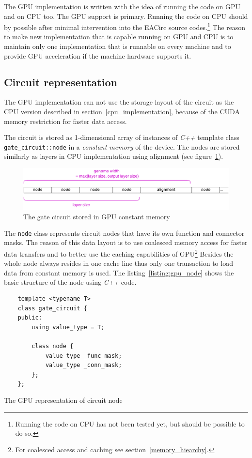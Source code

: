 \documentclass[12pt,oneside]{fithesis2}
\begin{document}
The GPU implementation is written with the idea of running the code on GPU and on CPU too. The GPU support is primary. Running the code on CPU should by possible after minimal intervention into the EACirc source codes.\footnote{Running the code on CPU has not been tested yet, but should be possible to do so.} The reason to make new implementation that is capable running on GPU and CPU is to maintain only one implementation that is runnable on every machine and to provide GPU acceleration if the machine hardware supports it.

\subsection{Circuit representation}
\label{gpu_curcuit_repr}

The GPU implementation can not use the storage layout of the circuit as the CPU version described in section~\ref{cpu_implementation}, because of the CUDA memory restriction for faster data access.

The circuit is stored as 1-dimensional array of instances of \emph{C++} template class \texttt{gate\_circuit::node} in a \emph{constant memory} of the device. The nodes are stored similarly as layers in CPU implementation using alignment (see figure~\ref{fig:gpu_genome}).

\begin{figure}[h]
	\centering
	\includegraphics[width=\textwidth]{figures/gpu_genome.pdf}
	\caption{The gate circuit stored in GPU constant memory}
	\label{fig:gpu_genome}
\end{figure}


The \texttt{node} class represents circuit nodes that have its own function and connector masks. The reason of this data layout is to use coalesced memory access for faster data transfers and to better use the caching capabilities of GPU\footnote{For coalesced access and caching see section~\ref{memory_hiearchy}.} Besides the whole node always resides in one cache line thus only one transaction to load data from constant memory is used. The listing~\ref{listing:gpu_node} shows the basic structure of the node using \emph{C++} code.

\begin{listing}[h]
	\begin{verbatim}
	template <typename T>
	class gate_circuit {
	public:
		using value_type = T;
		
		class node {
			value_type _func_mask;
			value_type _conn_mask;
		};	
	};
	\end{verbatim}
	\caption{The GPU representation of circuit node}
	\label{listing:gpu_node}
\end{listing}
\end{document}

